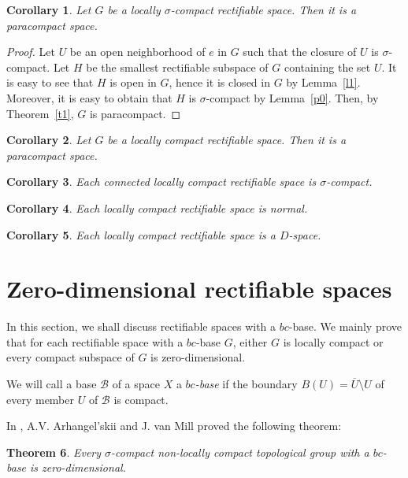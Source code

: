 \documentclass[psamsfonts,fceqn,leqno]{amsart}
\newtheorem{theorem}{Theorem}[section]
\newtheorem{corollary}[theorem]{Corollary}
\theoremstyle{definition}
\begin{document}
\begin{corollary}
Let $G$ be a locally $\sigma$-compact rectifiable space. Then it is a paracompact space.
\end{corollary}

\begin{proof}
Let $U$ be an open neighborhood of $e$ in $G$ such that the closure of $U$ is $\sigma$-compact. Let $H$ be the smallest rectifiable subspace of $G$ containing the set $U$. It is easy to see that $H$ is open in $G$, hence it is closed in $G$ by Lemma~\ref{l1}. Moreover, it is easy to obtain that $H$ is $\sigma$-compact by Lemma~\ref{p0}. Then, by Theorem~\ref{t1}, $G$ is paracompact.
\end{proof}

\begin{corollary}\label{c0}
Let $G$ be a locally compact rectifiable space. Then it is a paracompact space.
\end{corollary}

\begin{corollary}\label{c1}
Each connected locally compact rectifiable space is $\sigma$-compact.
\end{corollary}

\begin{corollary}\label{c2}
Each locally compact rectifiable space is normal.
\end{corollary}

\begin{corollary}\label{c3}
Each locally compact rectifiable space is a $D$-space.
\end{corollary}

\section{Zero-dimensional rectifiable spaces}
In this section, we shall discuss rectifiable spaces with a $bc$-base. We mainly prove that for each rectifiable space with a $bc$-base $G$, either $G$ is locally compact or every compact subspace of $G$ is zero-dimensional.

We will call a base $\mathscr{B}$ of a space $X$ a {\it $bc$-base} if the boundary $B(U)=\overline{U}\setminus U$ of every
member $U$ of $\mathscr{B}$ is compact.

In \cite{A2014}, A.V. Arhangel'skii and  J. van Mill proved the following theorem:

\begin{theorem}\cite{A2014}
Every $\sigma$-compact non-locally compact topological group with a $bc$-base is
zero-dimensional.
\end{theorem}
\end{document}
